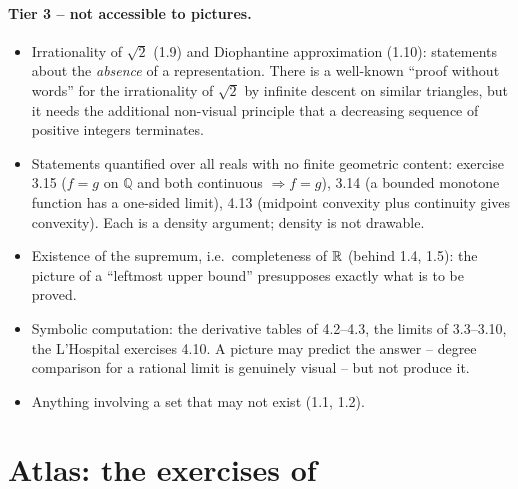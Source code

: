\paragraph{Tier 3 -- not accessible to pictures.}
\begin{itemize}\itemsep2pt
\item Irrationality of $\sqrt2$ (1.9) and Diophantine approximation (1.10): statements
  about the \emph{absence} of a representation. There is a well-known ``proof without
  words'' for the irrationality of $\sqrt2$ by infinite descent on similar triangles, but
  it needs the additional non-visual principle that a decreasing sequence of positive
  integers terminates.
\item Statements quantified over all reals with no finite geometric content: exercise
  3.15 ($f=g$ on $\mathbb{Q}$ and both continuous $\Rightarrow f=g$), 3.14 (a bounded
  monotone function has a one-sided limit), 4.13 (midpoint convexity plus continuity gives
  convexity). Each is a density argument; density is not drawable.
\item Existence of the supremum, i.e.\ completeness of $\mathbb{R}$ (behind 1.4, 1.5): the
  picture of a ``leftmost upper bound'' presupposes exactly what is to be proved.
\item Symbolic computation: the derivative tables of 4.2--4.3, the limits of 3.3--3.10,
  the L'Hospital exercises 4.10. A picture may predict the answer -- degree comparison for
  a rational limit is genuinely visual -- but not produce it.
\item Anything involving a set that may not exist (1.1, 1.2).
\end{itemize}

\section{Atlas: the exercises of \texorpdfstring{}{kalkulus gyakorlo.pdf}}
\label{sec:atlas}

\newcommand{\Yes}{\textbf{1}}
\newcommand{\Res}{\textbf{2}}
\newcommand{\No}{\textbf{3}}

